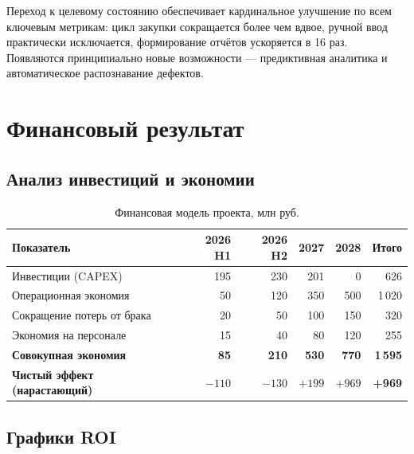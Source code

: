 \documentclass[12pt,a4paper]{article}
\begin{document}
Переход к целевому состоянию обеспечивает кардинальное улучшение по всем ключевым метрикам: цикл закупки сокращается более чем вдвое, ручной ввод практически исключается, формирование отчётов ускоряется в 16 раз. Появляются принципиально новые возможности --- предиктивная аналитика и автоматическое распознавание дефектов.

\newpage

\section{Финансовый результат}

\subsection{Анализ инвестиций и экономии}

\begin{table}[H]
\centering
\caption{Финансовая модель проекта, млн руб.}
\label{tab:roi}
\begin{tabular}{lrrrrr}
\toprule
\textbf{Показатель} & \textbf{2026 H1} & \textbf{2026 H2} & \textbf{2027} & \textbf{2028} & \textbf{Итого} \\
\midrule
Инвестиции (CAPEX) & 195 & 230 & 201 & 0 & 626 \\
Операционная экономия & 50 & 120 & 350 & 500 & 1\,020 \\
Сокращение потерь от брака & 20 & 50 & 100 & 150 & 320 \\
Экономия на персонале & 15 & 40 & 80 & 120 & 255 \\
\midrule
\textbf{Совокупная экономия} & \textbf{85} & \textbf{210} & \textbf{530} & \textbf{770} & \textbf{1\,595} \\
\textbf{Чистый эффект (нарастающий)} & $-110$ & $-130$ & $+199$ & $+969$ & \textbf{+969} \\
\bottomrule
\end{tabular}
\end{table}

\subsection{Графики ROI}
\end{document}
